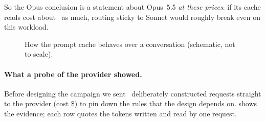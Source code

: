 \begin{table}[htbp]
\centering\small
\caption{Opus-host cost ratios (test split, tools-normalized) if Opus cache reads cost more than the table's
\$\PriceOpusRead\ per million tokens. Only that rate changes; every token count is as recorded.}
\label{tab:breakeven}

\end{table}

So the Opus conclusion is a statement about Opus~5.5 \emph{at these prices}: if its cache reads cost about
\BEReadMultiple\X\ as much, routing sticky to Sonnet would roughly break even on this workload.

\begin{figure}[htbp]
\centering

\caption{How the prompt cache behaves over a conversation (schematic, not to scale).}
\label{fig:cache}
\end{figure}

\paragraph{What a probe of the provider showed.} Before designing the campaign we sent \ProbeRequests\
deliberately constructed requests straight to the provider (cost \$\ProbeUSD) to pin down the rules that
the design depends on. \Cref{tab:probe} shows the evidence; each row quotes the tokens written and read by
one request.

\begin{table}[htbp]
\centering\small
\caption{The cache-semantics probe. ``P'' is a prompt prefix of \ProbePTokens\ tokens; ``P+X'' a longer
prompt of about \ProbeFullTokens\ tokens; ``Y'' a further \ProbeYTokens-token extension.}
\label{tab:probe}

\end{table}


